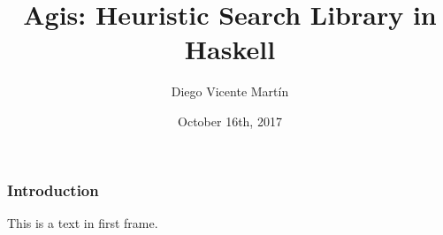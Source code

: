 \documentclass{beamer}
\title[Agis: Search in Haskell]{Agis: Heuristic Search Library in Haskell}
\author[Diego Vicente]{Diego Vicente Martín}
\institute{Universidad Carlos III de Madrid}
\date{October 16th, 2017}
\begin{document}
\frame{\titlepage}

\begin{frame}
\frametitle{Introduction}
This is a text in first frame.\\
\end{frame}
\end{document}
